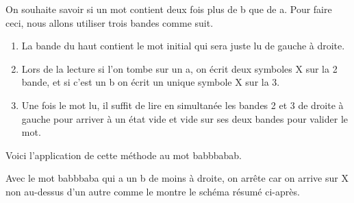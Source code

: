On souhaite savoir si un mot contient deux fois plus de b que de a. Pour faire ceci, nous allons utiliser trois bandes comme suit.
\begin{enumerate}
    \item La bande du haut contient le mot initial qui sera juste lu de gauche à droite.

    \item Lors de la lecture si l'on tombe sur un a, on écrit deux symboles X sur la 2\ieme{} bande, et si c'est un b on écrit un unique symbole X sur la 3\ieme{}.

    \item Une fois le mot lu, il suffit de lire en simultanée les bandes 2 et 3 de droite à gauche pour arriver à un état vide et vide sur ses deux bandes pour valider le mot.
\end{enumerate}

Voici l'application de cette méthode au mot babbbabab.


\medskip %




\bigskip

Avec le mot babbbaba qui a un b de moins à droite, on arrête car on arrive sur X non au-dessus d'un autre comme le montre le schéma résumé ci-après.


